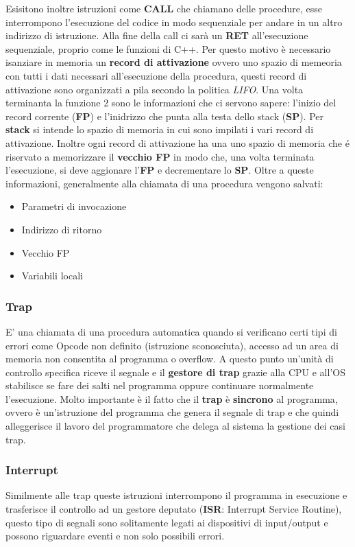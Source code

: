 \documentclass{article}
\begin{document}
Esisitono inoltre istruzioni come \textbf{CALL} che chiamano delle procedure, esse interrompono l'esecuzione del codice in modo sequenziale per andare in un altro indirizzo di istruzione. Alla fine della call ci sarà un \textbf{RET} all'esecuzione sequenziale, proprio come le funzioni di C++.  Per questo motivo è necessario isanziare in memoria un \textbf{record di attivazione} ovvero uno spazio di memeoria con tutti i dati necessari all'esecuzione della procedura, questi record di attivazione sono organizzati a pila secondo la politica \textit{LIFO}. Una volta terminanta la funzione 2 sono le informazioni che ci servono sapere: l'inizio del record corrente (\textbf{FP}) e l'inidrizzo che punta alla testa dello stack (\textbf{SP}). Per \textbf{stack} si intende lo spazio di memoria in cui sono impilati i vari record di attivazione. Inoltre ogni record di attivazione ha una uno spazio di memoria che é riservato a memorizzare il \textbf{vecchio FP} in modo che, una volta terminata l'esecuzione, si deve aggionare l'\textbf{FP} e decrementare lo \textbf{SP}. Oltre a queste informazioni, generalmente alla chiamata di una procedura vengono salvati:
\begin{itemize}
    \item Parametri di invocazione
    \item Indirizzo di ritorno
    \item Vecchio FP
    \item Variabili locali
\end{itemize}

\subsubsection{Trap}
E' una chiamata di una procedura automatica quando si verificano certi tipi di errori come Opcode non definito (istruzione sconosciuta), accesso ad un area di memoria non consentita al programma o overflow. A questo punto un'unità di controllo specifica riceve il segnale e il \textbf{gestore di trap} grazie alla CPU e all'OS stabilisce se fare dei salti nel programma oppure continuare normalmente l'esecuzione. Molto importante è il fatto che il \textbf{trap} è \textbf{sincrono} al programma, ovvero è un'istruzione del programma che genera il segnale di trap e che quindi alleggerisce il lavoro del programmatore che delega al sistema la gestione dei casi trap.

\subsubsection{Interrupt}
Similmente alle trap queste istruzioni interrompono il programma in esecuzione e trasferisce il controllo ad un gestore deputato (\textbf{ISR}: Interrupt Service Routine), questo tipo di segnali sono solitamente legati ai dispositivi di input/output e possono riguardare eventi e non solo possibili errori.
\end{document}
